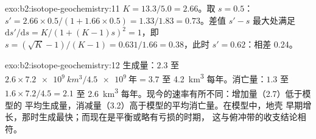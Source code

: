 \begin{solution}{exo:b2:isotope-geochemistry:11}
$K = 13.3/5.0 = 2.66$。取 $s = 0.5$：$s' = 2.66\times0.5/(1 + 1.66\times0.5) =
1.33/1.83 = 0.73$。差值 $s' - s$ 最大处满足
$\mathrm{d}s'/\mathrm{d}s = K/(1+(K-1)s)^2 = 1$，即 $s = (\sqrt K - 1)/(K-1) =
0.631/1.66 = 0.38$，此时 $s' = 0.62$：相差 0.24。
\end{solution}

\begin{solution}{exo:b2:isotope-geochemistry:12}
生成量：$2.3$ 至 $2.6\times\qty{7.2e9}{km^3}/\qty{4.5e9}{\text{年}} = 3.7$ 至
\qty{4.2}{km^3} 每年。消亡量：$1.3$ 至 $1.6\times7.2/4.5 = 2.1$ 至
\qty{2.6}{km^3} 每年。现今的速率有所不同：增加量（2.7）低于模型的
平均生成量，消减量（3.2）高于模型的平均消亡量。在模型中，地壳
早期增长，那时生成最快；而现在是平衡或略有亏损的时期，
这与俯冲带的收支结论相符。
\end{solution}

